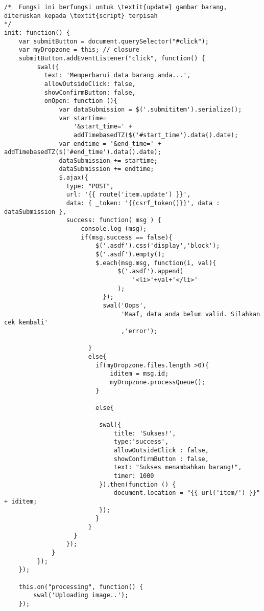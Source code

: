 \begin{lstlisting}[label=cdjq.03-02,style=htmlcssjs,caption=Kode Sumber \textit{View} Memperbarui Barang]
/*	Fungsi ini berfungsi untuk \textit{update} gambar barang, diteruskan kepada \textit{script} terpisah 
*/
init: function() {
    var submitButton = document.querySelector("#click");
    var myDropzone = this; // closure
	submitButton.addEventListener("click", function() {
		 swal({
		   text: 'Memperbarui data barang anda...',
		   allowOutsideClick: false,
		   showConfirmButton: false,
		   onOpen: function (){
		       var dataSubmission = $('.submititem').serialize();
		       var startime=
			       '&start_time=' + 
			       addTimebasedTZ($('#start_time').data().date);
		       var endtime = '&end_time=' + addTimebasedTZ($('#end_time').data().date);
		       dataSubmission += startime;
		       dataSubmission += endtime;
		       $.ajax({
		         type: "POST",
		         url: '{{ route('item.update') }}',
		         data: { _token: '{{csrf_token()}}', data : dataSubmission },
		         success: function( msg ) {
		             console.log (msg);
		             if(msg.success == false){
		                 $('.asdf').css('display','block');
		                 $('.asdf').empty();
		                 $.each(msg.msg, function(i, val){
		                       $('.asdf').append(
		                           '<li>'+val+'</li>'
		                       );
		                   });
		                   swal('Oops',
				                'Maaf, data anda belum valid. Silahkan cek kembali'
				                ,'error');
			
		               }
		               else{
		                 if(myDropzone.files.length >0){
		                     iditem = msg.id;
		                     myDropzone.processQueue();
		                 }
			
		                 else{
				
		                  swal({
		                      title: 'Sukses!',
		                      type:'success',
		                      allowOutsideClick : false,
		                      showConfirmButton : false,
		                      text: "Sukses menambahkan barang!",
		                      timer: 1000
		                  }).then(function () {
		                      document.location = "{{ url('item/') }}" + iditem;
		                  });
		                 }
		               }
		           }
		         });
		     }
		 });
	});

	this.on("processing", function() {
	    swal('Uploading image..');
	});


\end{lstlisting}
